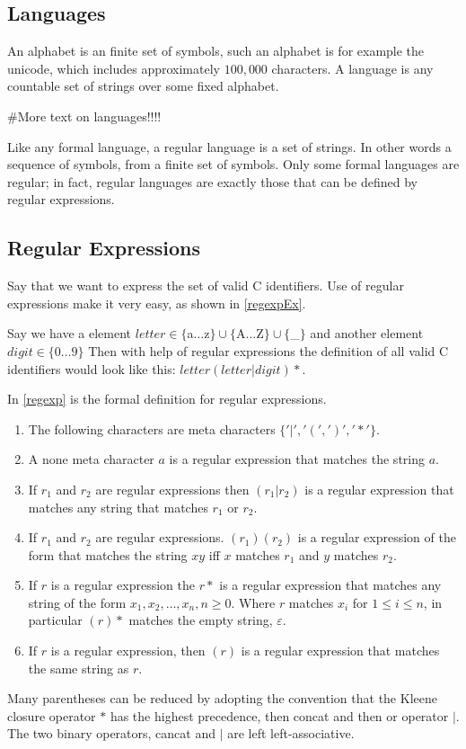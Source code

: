 \subsection{Languages}
An alphabet is an finite set of symbols, such an alphabet is for example the 
unicode, which includes approximately $100,000$ characters. A language is any 
countable set of strings over some fixed alphabet. \cite{Aho2006}

\#More text on languages!!!!

Like any formal language, a regular language is a set of strings. In other 
words a sequence of symbols,
from a finite set of symbols. Only some formal languages are regular; in fact, 
regular languages are exactly those that can be defined by regular expressions.
\cite{Ranta2012}
\subsection{Regular Expressions}
Say that we want to express the set of valid C identifiers. Use of regular 
expressions make it very easy, as shown in \cref{regexpEx}. 
\begin{example}\label{regexpEx}
Say we have a element $letter \in \{$a$ \dots $z$\} \cup \{$A$ \dots $Z$\} \cup 
\{$\_$\}$
and another element $digit \in \{0 \dots 9\}$
Then with help of regular expressions the definition of all valid C identifiers 
would look like this: $letter (letter | digit)*$. \cite{Aho2006}
\end{example}
In \cref{regexp} is the formal definition for regular expressions.
\begin{definition}\label{regexp} \cite{Aho1990}
\newline
\begin{enumerate}
  \item The following characters are meta characters $\{ '|', '(', ')', '*' \}$.
  \item A none meta character $a$ is a regular expression that matches the 
      string $a$.
  \item If $r_1$ and $r_2$ are regular expressions then $(r_1 | r_2)$ is a 
      regular expression that matches any string that matches $r_1$ or $r_2$.
  \item If $r_1$ and $r_2$ are regular expressions. $(r_1)(r_2)$ is a regular
      expression of the form that matches the string $xy$ iff $x$ matches $r_1$
      and $y$ matches $r_2$.
  \item If $r$ is a regular expression the $r*$ is a regular expression that
      matches any string of the form $x_1, x_2, \dots , x_n, n \geq 0$.
      Where $r$ matches $x_i$ for $1 \leq i \leq n$, in particular $(r)*$ 
      matches the empty string, $\varepsilon$.
  \item If $r$ is a regular expression, then $(r)$ is a regular expression that
      matches the same string as $r$.
\end{enumerate}
\end{definition}
Many parentheses can be reduced by adopting the convention that the Kleene
closure operator $*$ has the highest precedence, then concat and then or
operator $|$. The two binary operators, cancat and $|$ are left 
left-associative. \cite{Aho1990}
